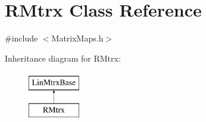 \hypertarget{classRMtrx}{}\section{R\+Mtrx Class Reference}
\label{classRMtrx}


{\ttfamily \#include $<$Matrix\+Maps.\+h$>$}

Inheritance diagram for R\+Mtrx\+:\begin{figure}[H]
\begin{center}
\leavevmode
\includegraphics[height=2.000000cm]{classRMtrx}
\end{center}
\end{figure}
